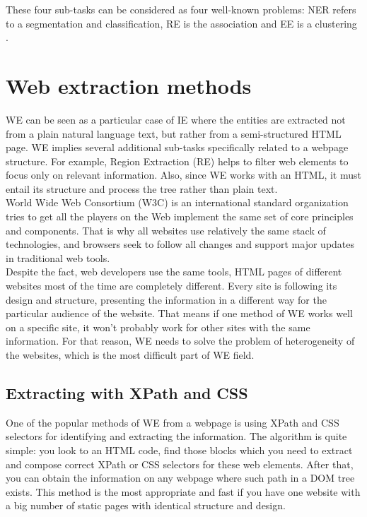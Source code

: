 These four sub-tasks can be considered as four well-known problems: NER refers to a segmentation and classification, RE is the association and EE is a clustering  \cite{ManLect}.\\

\section{Web extraction methods}


WE can be seen as a particular case of IE where the entities are extracted not from a plain natural language text, but rather from a semi-structured HTML page. WE implies several additional sub-tasks specifically related to a webpage structure. For example, Region Extraction (RE) helps to filter web elements to focus only on relevant information. Also, since WE works with an HTML, it must entail its structure and process the tree rather than plain text. \\

World Wide Web Consortium (W3C) is an international standard organization tries to get all the players on the Web implement the same set of core principles and components. That is why all websites use relatively the same stack of technologies, and browsers seek to follow all changes and support major updates in traditional web tools.\\

Despite the fact, web developers use the same tools, HTML pages of different websites most of the time are completely different. Every site is following its design and structure, presenting the information in a different way for the particular audience of the website. That means if one method of WE works well on a specific site, it won't probably work for other sites with the same information. For that reason, WE needs to solve the problem of heterogeneity of the websites, which is the most difficult part of WE field.

\subsection{Extracting with XPath and CSS}

One of the popular methods of WE from a webpage is using XPath and CSS selectors for identifying and extracting the information. The algorithm is quite simple: you look to an HTML code, find those blocks which you need to extract and compose correct XPath or CSS selectors for these web elements. After that, you can obtain the information on any webpage where such path in a DOM tree exists.  This method is the most appropriate and fast if you have one website with a big number of static pages with identical structure and design. \\

